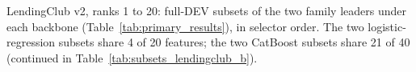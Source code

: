 \documentclass[final,5p,twocolumn]{elsarticle}
\providecommand{\DIFdeltex}[1]{{\protect\color{red} \scriptsize #1}} %
\providecommand{\DIFdelbegin}{} %
\providecommand{\DIFdelFL}[1]{\DIFdel{#1}} %
\providecommand{\DIFdel}[1]{\texorpdfstring{\DIFdeltex{#1}}{}} %
\begin{document}
\DIFdelbegin %
{%
\DIFdelFL{LendingClub v2, ranks 1 to 20: full-DEV subsets of the two family leaders under each backbone (Table~\ref{tab:primary_results}), in selector order. The two logistic-regression subsets share 4 of 20 features; the two CatBoost subsets share 21 of 40 (continued in Table~\ref{tab:subsets_lendingclub_b}).}}
\end{document}
